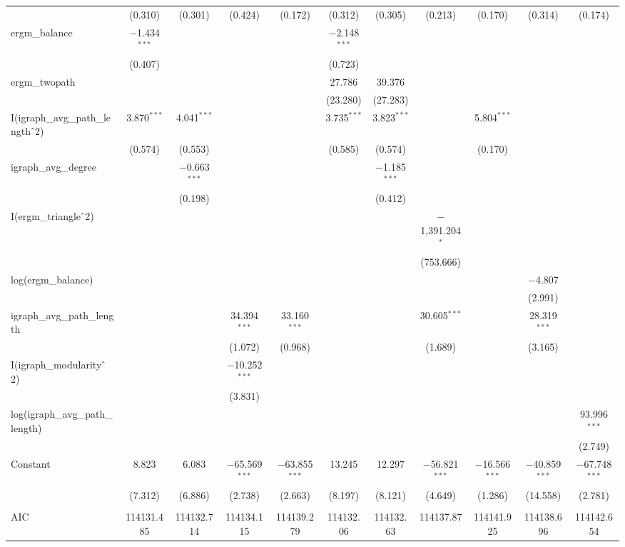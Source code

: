 \begin{table}[!htbp]
\begin{tabular}{@{\extracolsep{5pt}}lcccccccccc}
  & (0.310) & (0.301) & (0.424) & (0.172) & (0.312) & (0.305) & (0.213) & (0.170) & (0.314) & (0.174) \\ 
  ergm\_balance & $-$1.434$^{***}$ &  &  &  & $-$2.148$^{***}$ &  &  &  &  &  \\ 
  & (0.407) &  &  &  & (0.723) &  &  &  &  &  \\ 
  ergm\_twopath &  &  &  &  & 27.786 & 39.376 &  &  &  &  \\ 
  &  &  &  &  & (23.280) & (27.283) &  &  &  &  \\ 
  I(igraph\_avg\_path\_length$\hat{\mkern6mu}$2) & 3.870$^{***}$ & 4.041$^{***}$ &  &  & 3.735$^{***}$ & 3.823$^{***}$ &  & 5.804$^{***}$ &  &  \\ 
  & (0.574) & (0.553) &  &  & (0.585) & (0.574) &  & (0.170) &  &  \\ 
  igraph\_avg\_degree &  & $-$0.663$^{***}$ &  &  &  & $-$1.185$^{***}$ &  &  &  &  \\ 
  &  & (0.198) &  &  &  & (0.412) &  &  &  &  \\ 
  I(ergm\_triangle$\hat{\mkern6mu}$2) &  &  &  &  &  &  & $-$1,391.204$^{*}$ &  &  &  \\ 
  &  &  &  &  &  &  & (753.666) &  &  &  \\ 
  log(ergm\_balance) &  &  &  &  &  &  &  &  & $-$4.807 &  \\ 
  &  &  &  &  &  &  &  &  & (2.991) &  \\ 
  igraph\_avg\_path\_length &  &  & 34.394$^{***}$ & 33.160$^{***}$ &  &  & 30.605$^{***}$ &  & 28.319$^{***}$ &  \\ 
  &  &  & (1.072) & (0.968) &  &  & (1.689) &  & (3.165) &  \\ 
  I(igraph\_modularity$\hat{\mkern6mu}$2) &  &  & $-$10.252$^{***}$ &  &  &  &  &  &  &  \\ 
  &  &  & (3.831) &  &  &  &  &  &  &  \\ 
  log(igraph\_avg\_path\_length) &  &  &  &  &  &  &  &  &  & 93.996$^{***}$ \\ 
  &  &  &  &  &  &  &  &  &  & (2.749) \\ 
  Constant & 8.823 & 6.083 & $-$65.569$^{***}$ & $-$63.855$^{***}$ & 13.245 & 12.297 & $-$56.821$^{***}$ & $-$16.566$^{***}$ & $-$40.859$^{***}$ & $-$67.748$^{***}$ \\ 
  & (7.312) & (6.886) & (2.738) & (2.663) & (8.197) & (8.121) & (4.649) & (1.286) & (14.558) & (2.781) \\ 
 \hline \\[-1.8ex] 
AIC & 114131.485 & 114132.714 & 114134.115 & 114139.279 & 114132.06 & 114132.63 & 114137.87 & 114141.925 & 114138.696 & 114142.654 \\ 

\end{tabular}
\end{table}
